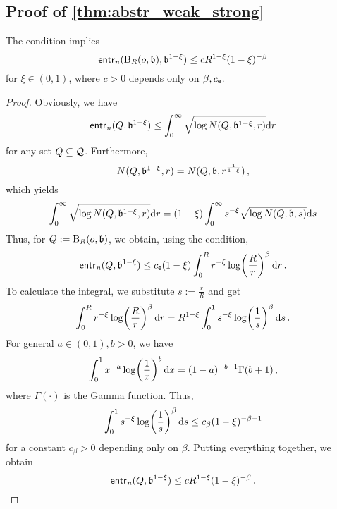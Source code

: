 \subsection{Proof of \autoref{thm:abstr_weak_strong}}
%
\begin{lemma}\label{lmm:entropyuse}
	The condition  implies
	\begin{equation*}
		\operatorname{\mathsf{entr}_\mathit{n}}(\operatorname{\mathrm{B}}_{R}(o, \mathfrak{b}), \mathfrak{b}^{1-\xi})
		\leq 
		c R^{1-\xi} (1-\xi)^{-\beta}
	\end{equation*}
	for $\xi \in (0,1)$, where $c > 0$ depends only on $\beta, c_{\mathsf{e}}$.
\end{lemma}
\begin{proof}
	Obviously, we have
	\begin{equation*}
		\operatorname{\mathsf{entr}_\mathit{n}}(Q, \mathfrak{b}^{1-\xi}) \leq \int_0^\infty \sqrt{\log N(Q, \mathfrak{b}^{1-\xi}, r)} \mathrm{d} r
	\end{equation*}
	for any set $Q \subseteq \mathcal{Q}$. Furthermore,
	\begin{equation*}
		N(Q, \mathfrak{b}^{1-\xi}, r) = N(Q, \mathfrak{b}, r^{\frac1{1-\xi}})
		\, ,
	\end{equation*}
	which yields
	\begin{equation*}
		\int_0^\infty \sqrt{\log N(Q, \mathfrak{b}^{1-\xi}, r)} \mathrm{d} r
		=
		(1-\xi) \int_0^\infty s^{-\xi} \sqrt{\log N(Q, \mathfrak{b}, s)} \mathrm{d} s
	\end{equation*}
	Thus, for $Q := \operatorname{\mathrm{B}}_{R}(o, \mathfrak{b})$, we obtain, using the  condition,
	\begin{equation*}
		\operatorname{\mathsf{entr}_\mathit{n}}(Q, \mathfrak{b}^{1-\xi})
		\leq 
		c_{\mathsf{e}} (1-\xi) \int_0^R r^{-\xi} \log\!\left( \frac{R}{r} \right)^\beta \mathrm{d} r
		\, .
	\end{equation*}
	To calculate the integral, we substitute $s := \frac rR$ and get
	\begin{equation*}
		\int_0^R r^{-\xi} \log\!\left( \frac{R}{r} \right)^\beta \mathrm{d} r
		=
		R^{1-\xi} \int_0^1 s^{-\xi} \log\!\left( \frac{1}{s} \right)^\beta \mathrm{d} s
		\, .
	\end{equation*}
	For general $a\in(0,1),b>0$, we have
	\begin{equation*}
		\int_0^1 x^{-a} \log\!\left( \frac1x \right)^b \mathrm{d} x = (1-a)^{-b-1} \Gamma(b+1)
		\, ,
	\end{equation*}
	where $\Gamma(\cdot)$ is the Gamma function.
	Thus,
	\begin{equation*}
		\int_0^1 s^{-\xi} \log\!\left( \frac{1}{s} \right)^\beta \mathrm{d} s \leq c_\beta (1-\xi)^{-\beta-1}
	\end{equation*}
	for a constant $c_\beta > 0$ depending only on $\beta$.
	Putting everything together, we obtain
	\begin{equation*}
		\operatorname{\mathsf{entr}_\mathit{n}}(Q, \mathfrak{b}^{1-\xi})
		\leq 
		c R^{1-\xi} (1-\xi)^{-\beta}
		\, .
	\end{equation*}
\end{proof}
